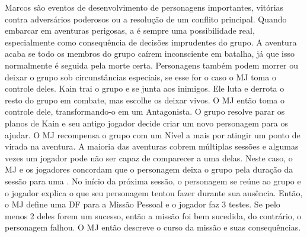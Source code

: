 Marcos são eventos de desenvolvimento de personagens importantes, vitórias contra adversários poderosos ou a resolução de um conflito principal. 
Quando embarcar em aventuras perigosas, a  é sempre uma possibilidade real, especialmente como consequência de decisões imprudentes do grupo. 
A aventura acaba se todo os membros do grupo caírem inconsciente em batalha, já que isso normalmente é seguida pela morte certa. 
Personagens também podem morrer ou deixar o grupo sob circunstâncias especiais, se esse for o caso o MJ toma o controle deles.
%
\ofpar
%
{
	Kain trai o grupo e se junta aos inimigos. 
	Ele luta e derrota o resto do grupo em combate, mas escolhe os deixar vivos. 
	O MJ então toma o controle dele, transformando-o em um Antagonista. 
	O grupo resolve parar os planos de Kain e seu antigo jogador decide criar um novo personagem para os ajudar. 
	O MJ recompensa o grupo com um Nível a mais por atingir um ponto de virada na aventura.
}
%
\vfill
%
A maioria das aventuras cobrem múltiplas sessões e algumas vezes um jogador pode não ser capaz de comparecer a uma delas. 
Neste caso, o MJ e os jogadores concordam que o personagem deixa o grupo pela duração da sessão para uma .
No início da próxima sessão, o personagem se reúne ao grupo e o jogador explica o que seu personagem tentou fazer durante sua ausência. 
Então, o MJ define uma DF para a Missão Pessoal e o jogador faz 3 testes. 
Se pelo menos 2 deles forem um sucesso, então a missão foi bem sucedida, do contrário, o personagem falhou. O MJ então descreve o curso da missão e suas consequências.
%
\clearpage